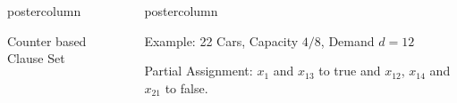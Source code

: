 \documentclass[final]{beamer}
\newlength{\columnheight}
\begin{document}
\begin{frame}
\begin{columns}
\begin{column}{.49\textwidth}
\begin{beamercolorbox}[center,wd=\textwidth]{postercolumn}
\begin{minipage}[T]{.95\textwidth}
{\begin{block}{Counter based Clause Set}
\begin{center}
                \end{center}
            \end{block}
            \vfill
          }
        \end{minipage}
      \end{beamercolorbox}
    \end{column}

    \begin{column}{.49\textwidth}
      \begin{beamercolorbox}[center,wd=\textwidth]{postercolumn}
        \begin{minipage}[T]{.95\textwidth} %
          \parbox[t][\columnheight]{\textwidth}{ %
            
            \begin{block}{Example: 22 Cars, Capacity $4/8$, Demand $d=12$}

                
                Partial Assignment: $x_{1}$ and $x_{13}$ to true and $x_{12}$, $x_{14}$
                and $x_{21}$ to false.
                

\end{block}}
\end{minipage}
\end{beamercolorbox}
\end{column}
\end{columns}
\end{frame}
\end{document}
